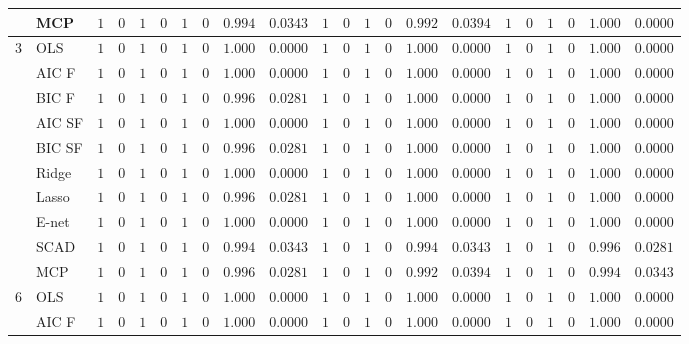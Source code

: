 \begin{tabular}{ll|ll|llllll|llllll|llllll}
 & MCP  & $1$ & $0$ & $1$ & $0$ & $1$ & $0$ & $0.994$ & $0.0343$ & $1$ & $0$ & $1$ & $0$ & $0.992$ & $0.0394$ & $1$ & $0$ & $1$ & $0$ & $1.000$ & $0.0000$ \\\hline
3 & OLS  & $1$ & $0$ & $1$ & $0$ & $1$ & $0$ & $1.000$ & $0.0000$ & $1$ & $0$ & $1$ & $0$ & $1.000$ & $0.0000$ & $1$ & $0$ & $1$ & $0$ & $1.000$ & $0.0000$ \\
 & AIC F  & $1$ & $0$ & $1$ & $0$ & $1$ & $0$ & $1.000$ & $0.0000$ & $1$ & $0$ & $1$ & $0$ & $1.000$ & $0.0000$ & $1$ & $0$ & $1$ & $0$ & $1.000$ & $0.0000$ \\
 & BIC F  & $1$ & $0$ & $1$ & $0$ & $1$ & $0$ & $0.996$ & $0.0281$ & $1$ & $0$ & $1$ & $0$ & $1.000$ & $0.0000$ & $1$ & $0$ & $1$ & $0$ & $1.000$ & $0.0000$ \\
 & AIC SF  & $1$ & $0$ & $1$ & $0$ & $1$ & $0$ & $1.000$ & $0.0000$ & $1$ & $0$ & $1$ & $0$ & $1.000$ & $0.0000$ & $1$ & $0$ & $1$ & $0$ & $1.000$ & $0.0000$ \\
 & BIC SF  & $1$ & $0$ & $1$ & $0$ & $1$ & $0$ & $0.996$ & $0.0281$ & $1$ & $0$ & $1$ & $0$ & $1.000$ & $0.0000$ & $1$ & $0$ & $1$ & $0$ & $1.000$ & $0.0000$ \\
 & Ridge  & $1$ & $0$ & $1$ & $0$ & $1$ & $0$ & $1.000$ & $0.0000$ & $1$ & $0$ & $1$ & $0$ & $1.000$ & $0.0000$ & $1$ & $0$ & $1$ & $0$ & $1.000$ & $0.0000$ \\
 & Lasso  & $1$ & $0$ & $1$ & $0$ & $1$ & $0$ & $0.996$ & $0.0281$ & $1$ & $0$ & $1$ & $0$ & $1.000$ & $0.0000$ & $1$ & $0$ & $1$ & $0$ & $1.000$ & $0.0000$ \\
 & E-net  & $1$ & $0$ & $1$ & $0$ & $1$ & $0$ & $1.000$ & $0.0000$ & $1$ & $0$ & $1$ & $0$ & $1.000$ & $0.0000$ & $1$ & $0$ & $1$ & $0$ & $1.000$ & $0.0000$ \\
 & SCAD  & $1$ & $0$ & $1$ & $0$ & $1$ & $0$ & $0.994$ & $0.0343$ & $1$ & $0$ & $1$ & $0$ & $0.994$ & $0.0343$ & $1$ & $0$ & $1$ & $0$ & $0.996$ & $0.0281$ \\
 & MCP  & $1$ & $0$ & $1$ & $0$ & $1$ & $0$ & $0.996$ & $0.0281$ & $1$ & $0$ & $1$ & $0$ & $0.992$ & $0.0394$ & $1$ & $0$ & $1$ & $0$ & $0.994$ & $0.0343$ \\\hline
6 & OLS  & $1$ & $0$ & $1$ & $0$ & $1$ & $0$ & $1.000$ & $0.0000$ & $1$ & $0$ & $1$ & $0$ & $1.000$ & $0.0000$ & $1$ & $0$ & $1$ & $0$ & $1.000$ & $0.0000$ \\
 & AIC F  & $1$ & $0$ & $1$ & $0$ & $1$ & $0$ & $1.000$ & $0.0000$ & $1$ & $0$ & $1$ & $0$ & $1.000$ & $0.0000$ & $1$ & $0$ & $1$ & $0$ & $1.000$ & $0.0000$ \\

\end{tabular}
